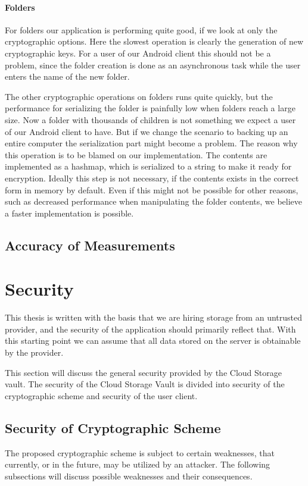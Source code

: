 \documentclass[pdftex,english,10pt,b5paper,twoside]{book}
\begin{document}

\paragraph{Folders} For folders our application is performing quite good, if we
look at only the cryptographic options. Here the slowest operation is clearly
the generation of new cryptographic keys. For a user of our Android client this
should not be a problem, since the folder creation is done as an asynchronous
task while the user enters the name of the new folder.

The other cryptographic operations on folders runs quite quickly, but the
performance for serializing the folder is painfully low when folders reach a
large size. Now a folder with thousands of children is not something we expect
a user of our Android client to have. But if we change the scenario to backing
up an entire computer the serialization part might become a problem. The reason
why this operation is to be blamed on our implementation. The contents are
implemented as a hashmap, which is serialized to a string to make it ready for
encryption. Ideally this step is not necessary, if the contents exists in the
correct form in memory by default. Even if this might not be possible for other
reasons, such as decreased performance when manipulating the folder contents,
we believe a faster implementation is possible.

\subsection{Accuracy of Measurements}

\section{Security}
This thesis is written with the basis that we are hiring storage from an
untrusted provider, and the security of the application should primarily
reflect that. With this starting point we can assume that all data stored on
the server is obtainable by the provider.

This section will discuss the general security provided by the Cloud Storage
vault. The security of the Cloud Storage Vault is divided into security of the
cryptographic scheme and security of the user client.

\subsection{Security of Cryptographic Scheme}
The proposed cryptographic scheme is subject to certain weaknesses, that
currently, or in the future, may be utilized by an attacker. The following
subsections will discuss possible weaknesses and their consequences.
\end{document}
